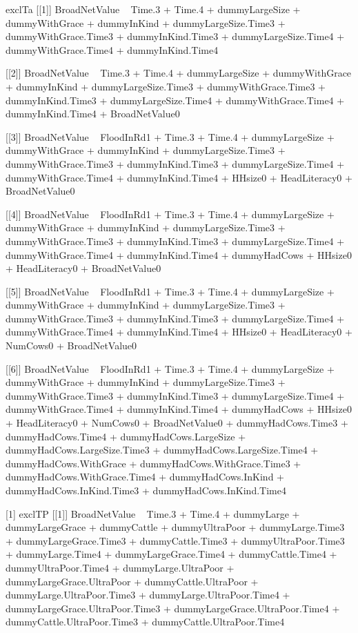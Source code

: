 \begin{Schunk}
\begin{Soutput}
[1] exclTa
[[1]]
BroadNetValue ~ Time.3 + Time.4 + dummyLargeSize + dummyWithGrace + 
    dummyInKind + dummyLargeSize.Time3 + dummyWithGrace.Time3 + 
    dummyInKind.Time3 + dummyLargeSize.Time4 + dummyWithGrace.Time4 + 
    dummyInKind.Time4

[[2]]
BroadNetValue ~ Time.3 + Time.4 + dummyLargeSize + dummyWithGrace + 
    dummyInKind + dummyLargeSize.Time3 + dummyWithGrace.Time3 + 
    dummyInKind.Time3 + dummyLargeSize.Time4 + dummyWithGrace.Time4 + 
    dummyInKind.Time4 + BroadNetValue0

[[3]]
BroadNetValue ~ FloodInRd1 + Time.3 + Time.4 + dummyLargeSize + 
    dummyWithGrace + dummyInKind + dummyLargeSize.Time3 + dummyWithGrace.Time3 + 
    dummyInKind.Time3 + dummyLargeSize.Time4 + dummyWithGrace.Time4 + 
    dummyInKind.Time4 + HHsize0 + HeadLiteracy0 + BroadNetValue0

[[4]]
BroadNetValue ~ FloodInRd1 + Time.3 + Time.4 + dummyLargeSize + 
    dummyWithGrace + dummyInKind + dummyLargeSize.Time3 + dummyWithGrace.Time3 + 
    dummyInKind.Time3 + dummyLargeSize.Time4 + dummyWithGrace.Time4 + 
    dummyInKind.Time4 + dummyHadCows + HHsize0 + HeadLiteracy0 + 
    BroadNetValue0

[[5]]
BroadNetValue ~ FloodInRd1 + Time.3 + Time.4 + dummyLargeSize + 
    dummyWithGrace + dummyInKind + dummyLargeSize.Time3 + dummyWithGrace.Time3 + 
    dummyInKind.Time3 + dummyLargeSize.Time4 + dummyWithGrace.Time4 + 
    dummyInKind.Time4 + HHsize0 + HeadLiteracy0 + NumCows0 + 
    BroadNetValue0

[[6]]
BroadNetValue ~ FloodInRd1 + Time.3 + Time.4 + dummyLargeSize + 
    dummyWithGrace + dummyInKind + dummyLargeSize.Time3 + dummyWithGrace.Time3 + 
    dummyInKind.Time3 + dummyLargeSize.Time4 + dummyWithGrace.Time4 + 
    dummyInKind.Time4 + dummyHadCows + HHsize0 + HeadLiteracy0 + 
    NumCows0 + BroadNetValue0 + dummyHadCows.Time3 + dummyHadCows.Time4 + 
    dummyHadCows.LargeSize + dummyHadCows.LargeSize.Time3 + dummyHadCows.LargeSize.Time4 + 
    dummyHadCows.WithGrace + dummyHadCows.WithGrace.Time3 + dummyHadCows.WithGrace.Time4 + 
    dummyHadCows.InKind + dummyHadCows.InKind.Time3 + dummyHadCows.InKind.Time4

[1] exclTP
[[1]]
BroadNetValue ~ Time.3 + Time.4 + dummyLarge + dummyLargeGrace + 
    dummyCattle + dummyUltraPoor + dummyLarge.Time3 + dummyLargeGrace.Time3 + 
    dummyCattle.Time3 + dummyUltraPoor.Time3 + dummyLarge.Time4 + 
    dummyLargeGrace.Time4 + dummyCattle.Time4 + dummyUltraPoor.Time4 + 
    dummyLarge.UltraPoor + dummyLargeGrace.UltraPoor + dummyCattle.UltraPoor + 
    dummyLarge.UltraPoor.Time3 + dummyLarge.UltraPoor.Time4 + 
    dummyLargeGrace.UltraPoor.Time3 + dummyLargeGrace.UltraPoor.Time4 + 
    dummyCattle.UltraPoor.Time3 + dummyCattle.UltraPoor.Time4


\end{Soutput}
\end{Schunk}
